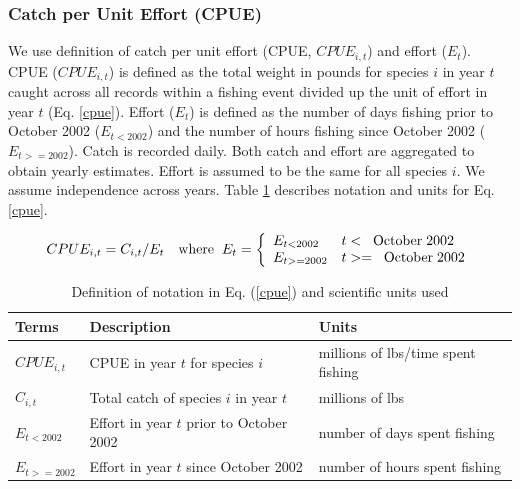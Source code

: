 \documentclass[oneside,12pt,final]{sty/ucthesis-CA2012}
\begin{document}
\begin{mainmatter}
\subsubsection{Catch per Unit Effort (CPUE)}
We use \citet{langseth2018stock} definition of catch per unit effort (CPUE, $CPUE_{i,t}$) and effort ($E_t$). CPUE ($CPUE_{i,t}$) is defined as the total weight in pounds for species $i$ in year $t$ caught across all records within a fishing event divided up the unit of effort in year $t$ (Eq. \ref{cpue}). Effort ($E_t$) is defined as the number of days fishing prior to October 2002 ($E_{t<2002}$) and the number of hours fishing since October 2002 ($E_{t>=2002} $). Catch is recorded daily. Both catch and effort are aggregated to obtain yearly estimates. Effort is assumed to be the same for all species $i$. We assume independence across years. Table \ref{cpue_table} describes notation and units for Eq. \ref{cpue}.

\begin{equation}  \label{cpue}
CPUE_{i,t} = C_{i,t}/E_t \quad \text{where} \hspace{2mm} E_t = \left\{ 
\begin{array}{ll}
E_{t<2002} & t< \hspace{2mm} \text{October} \hspace{1mm}  2002 \\
E_{t>=2002} & t>= \hspace{2mm} \text{October} \hspace{1mm} 2002 
\end{array}  \right. 
\end{equation}

\begin{table}[H]
\centering
\caption{Definition of notation in Eq. (\ref{cpue}) and scientific units used}
\begin{tabular}{l|l|l}
  \hline \small
 Terms & Description & Units  \\ 
   \hline     
   $CPUE_{i,t}$ & CPUE in year $t$ for species $i$ & millions of lbs/time spent fishing \\
   $C_{i,t}$ & Total catch of species $i$ in year $t$ & millions of lbs \\
   $E_{t<2002}$ & Effort in year $t$ prior to October 2002 & number of days spent fishing \\
   $E_{t>=2002}$ & Effort in year $t$  since October 2002 & number of hours spent fishing \\
   \hline
\end{tabular} 
\label{cpue_table}
\end{table}


\end{mainmatter}
\end{document}

